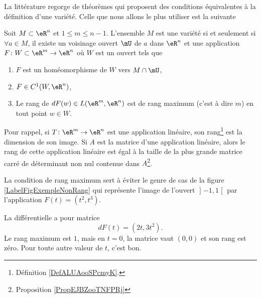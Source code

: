 La littérature regorge de théorèmes qui proposent des conditions équivalentes à la définition d'une variété. Celle que nous allons le plus utiliser est la suivante%
\begin{proposition}
    Soit $M\subset\eR^n$ et $1\leq m\leq n-1$. L'ensemble $M$ est une variété si et seulement si $\forall a\in M$, il existe un voisinage ouvert $\mU$ de $a$ dans $\eR^n$ et une application $F\colon W\subset\eR^m\to \eR^n$ où $W$ est un ouvert tels que
    \begin{enumerate}
        \item
            $F$ est un homéomorphisme de $W$ vers $M\cap\mU$,
        \item
            $F\in C^1(W,\eR^n)$,
        \item
            Le rang de $dF(w)\in L(\eR^m,\eR^n)$ est de rang maximum (c'est à dire $m$) en tout point $w\in W$.
    \end{enumerate}
\end{proposition}

Pour rappel, si $T\colon \eR^m\to \eR^n$ est une application linéaire, son rang\footnote{Définition \ref{DefALUAooSPcmyK}.} est la dimension de son image. Si $A$ est la matrice d'une application linéaire, alors le rang de cette application linéaire est égal à la taille de la plus grande matrice carré de déterminant non nul contenue dans $A$\footnote{Proposition \ref{PropEJBZooTNFPRj}}.

La condition de rang maximum sert à éviter le genre de cas de la figure \ref{LabelFigExempleNonRang} qui représente l'image de l'ouvert $\mathopen] -1 , 1 \mathclose[$ par l'application $F(t)=(t^2,t^3)$.
\newcommand{\CaptionFigExempleNonRang}{Quelque chose qui n'est pas de rang maximum et qui n'est pas une variété.}

%
La différentielle a pour matrice
\begin{equation}
    dF(t)=(2t,3t^2).
\end{equation}
Le rang maximum est $1$, mais en $t=0$, la matrice vaut $(0,0)$ et son rang est zéro. Pour toute autre valeur de $t$, c'est bon.


